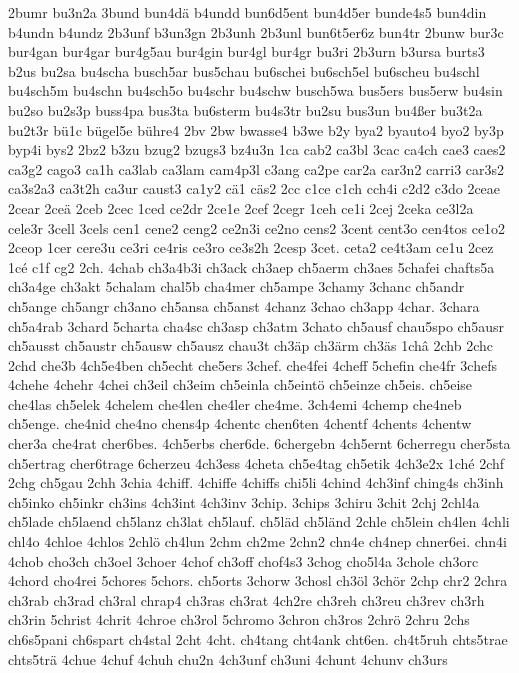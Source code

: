 {2bumr
bu3n2a
3bund
bun4dä
b4undd
bun6d5ent
bun4d5er
bunde4s5
bun4din
b4undn
b4undz
2b3unf
b3un3gn
2b3unh
2b3unl
bun6t5er6z
bun4tr
2bunw
bur3c
bur4gan
bur4gar
bur4g5au
bur4gin
bur4gl
bur4gr
bu3ri
2b3urn
b3ursa
burts3
b2us
bu2sa
bu4scha
busch5ar
bus5chau
bu6schei
bu6sch5el
bu6scheu
bu4schl
bu4sch5m
bu4schn
bu4sch5o
bu4schr
bu4schw
busch5wa
bus5ers
bus5erw
bu4sin
bu2so
bu2s3p
buss4pa
bus3ta
bu6sterm
bu4s3tr
bu2su
bus3un
bu4ßer
bu3t2a
bu2t3r
bü1c
bügel5e
bühre4
2bv
2bw
bwasse4
b3we
b2y
bya2
byauto4
byo2
by3p
byp4i
bys2
2bz2
b3zu
bzug2
bzugs3
bz4u3n
1ca
cab2
ca3bl
3cac
ca4ch
cae3
caes2
ca3g2
cago3
ca1h
ca3lab
ca3lam
cam4p3l
c3ang
ca2pe
car2a
car3n2
carri3
car3s2
ca3s2a3
ca3t2h
ca3ur
caust3
ca1y2
cä1
cäs2
2cc
c1ce
c1ch
cch4i
c2d2
c3do
2ceae
2cear
2ceä
2ceb
2cec
1ced
ce2dr
2ce1e
2cef
2cegr
1ceh
ce1i
2cej
2ceka
ce3l2a
cele3r
3cell
3cels
cen1
cene2
ceng2
ce2n3i
ce2no
cens2
3cent
cent3o
cen4tos
ce1o2
2ceop
1cer
cere3u
ce3ri
ce4ris
ce3ro
ce3s2h
2cesp
3cet.
ceta2
ce4t3am
ce1u
2cez
1cé
c1f
cg2
2ch.
4chab
ch3a4b3i
ch3ack
ch3aep
ch5aerm
ch3aes
5chafei
chafts5a
ch3a4ge
ch3akt
5chalam
chal5b
cha4mer
ch5ampe
3chamy
3chanc
ch5andr
ch5ange
ch5angr
ch3ano
ch5ansa
ch5anst
4chanz
3chao
ch3app
4char.
3chara
ch5a4rab
3chard
5charta
cha4sc
ch3asp
ch3atm
3chato
ch5ausf
chau5spo
ch5ausr
ch5ausst
ch5austr
ch5ausw
ch5ausz
chau3t
ch3äp
ch3ärm
ch3äs
1châ
2chb
2chc
2chd
che3b
4ch5e4ben
ch5echt
che5ers
3chef.
che4fei
4cheff
5chefin
che4fr
3chefs
4chehe
4chehr
4chei
ch3eil
ch3eim
ch5einla
ch5eintö
ch5einze
ch5eis.
ch5eise
che4las
ch5elek
4chelem
che4len
che4ler
che4me.
3ch4emi
4chemp
che4neb
ch5enge.
che4nid
che4no
chens4p
4chentc
chen6ten
4chentf
4chents
4chentw
cher3a
che4rat
cher6bes.
4ch5erbs
cher6de.
6chergebn
4ch5ernt
6cherregu
cher5sta
ch5ertrag
cher6trage
6cherzeu
4ch3ess
4cheta
ch5e4tag
ch5etik
4ch3e2x
1ché
2chf
2chg
ch5gau
2chh
3chia
4chiff.
4chiffe
4chiffs
chi5li
4chind
4ch3inf
ching4s
ch3inh
ch5inko
ch5inkr
ch3ins
4ch3int
4ch3inv
3chip.
3chips
3chiru
3chit
2chj
2chl4a
ch5lade
ch5laend
ch5lanz
ch3lat
ch5lauf.
ch5läd
ch5länd
2chle
ch5lein
ch4len
4chli
chl4o
4chloe
4chlos
2chlö
ch4lun
2chm
ch2me
2chn2
chn4e
ch4nep
chner6ei.
chn4i
4chob
cho3ch
ch3oel
3choer
4chof
ch3off
chof4s3
3chog
cho5l4a
3chole
ch3orc
4chord
cho4rei
5chores
5chors.
ch5orts
3chorw
3chosl
ch3öl
3chör
2chp
chr2
2chra
ch3rab
ch3rad
ch3ral
chrap4
ch3ras
ch3rat
4ch2re
ch3reh
ch3reu
ch3rev
ch3rh
ch3rin
5christ
4chrit
4chroe
ch3rol
5chromo
3chron
ch3ros
2chrö
2chru
2chs
ch6s5pani
ch6spart
ch4stal
2cht
4cht.
ch4tang
cht4ank
cht6en.
ch4t5ruh
chts5trae
chts5trä
4chue
4chuf
4chuh
chu2n
4ch3unf
ch3uni
4chunt
4chunv
ch3urs
}
